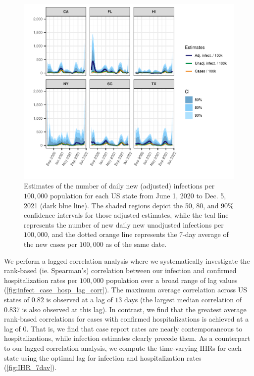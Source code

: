 \documentclass{article}
\begin{document}
\begin{figure}[!tb]
\centering
    \includegraphics[width=.99\textwidth]{state_niauc_est_faceted.pdf} %
    \caption{Estimates of the number of daily new (adjusted) infections per $100,000$ population for each US state from June 1, 2020 to Dec. 5, 2021 (dark blue line). The shaded regions depict the 50, 80, and 90\% confidence intervals for those adjusted estimates, while the teal line represents the number of new daily new unadjusted infections per $100,000$, and the dotted orange line represents the 7-day average of the new cases per $100,000$ as of the same date.}
    \label{fig:state_niauc_est_faceted}
\end{figure}

We perform a lagged correlation analysis where we systematically investigate the rank-based (ie. Spearman’s) correlation between our infection and confirmed hospitalization rates per $100,000$ population over a broad range of lag values (\autoref{fig:infect_case_hosp_lag_corr}). The maximum average correlation across US states of $0.82$ is observed at a lag of $13$ days (the largest median correlation of $0.837$ is also observed at this lag). In contrast, we find that the greatest average rank-based correlations for cases with confirmed hospitalizations is achieved at a lag of $0$. That is, we find that case report rates are nearly contemporaneous to hospitalizations, while infection estimates clearly precede them. As a counterpart to our lagged correlation analysis, we compute the time-varying IHRs for each state using the optimal lag for infection and hospitalization rates (\autoref{fig:IHR_7dav}). 
\end{document}
